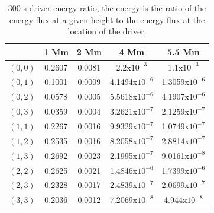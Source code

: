 \documentclass[preprint,authoryear,12pt]{elsarticle}
\begin{document}
\begin{table}[h]
\centering
\begin{tabular}{c c c c c }
\hline
   &  1 Mm & 2 Mm & 4 Mm & 5.5 Mm \\
\hline
$(0, 0)$ &  0.2607 & 0.0081 & 2.2x$10^{-3}$ &  1.1x$10^{-3}$\\
\hline
$(0, 1)$ & 0.1001 & 0.0009 & 4.1494x$10^{-6}$ &  1.3059x$10^{-6}$\\
\hline
$(0, 2)$ & 0.0578 & 0.0005 & 5.5618x$10^{-6}$ &  4.1907x$10^{-6}$\\
\hline
$(0, 3)$ & 0.0359 & 0.0004 &3.2621x$10^{-7}$ &  2.1259x$10^{-7}$\\
\hline
$(1, 1)$ & 0.2267 & 0.0016 & 9.9329x$10^{-7}$ &  1.0749x$10^{-7}$\\
\hline
$(1, 2)$ & 0.2535 & 0.0016 & 8.2058x$10^{-7}$ &  2.8814x$10^{-7}$\\
\hline
$(1, 3)$ & 0.2692 & 0.0023 & 2.1995x$10^{-7}$ &  9.0161x$10^{-8}$\\
\hline
$(2, 2)$ & 0.2625 & 0.0021 & 1.4846x$10^{-6}$ &  1.7399x$10^{-6}$\\
\hline
$(2, 3)$ & 0.2328 & 0.0017 & 2.4839x$10^{-7}$ &  2.0699x$10^{-7}$\\
\hline
$(3, 3)$ & 0.2036 & 0.0012 & 7.2069x$10^{-8}$ &  4.944x$10^{-8}$\\
\hline
\end{tabular} 
\caption{300 s driver energy ratio, the energy is the ratio of the energy flux at a given height to the energy flux at the location of the driver.}
\label{Table300mode}
\end{table}









\end{document}
